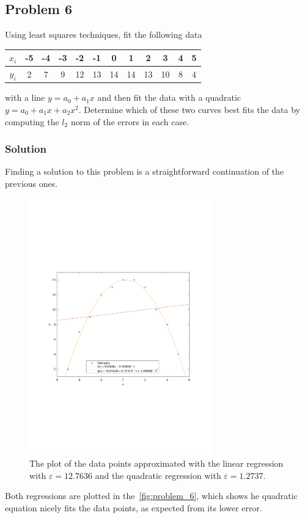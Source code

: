 \subsection{Problem 6}%
\label{sec:problem_6}
Using least squares techniques, fit the following data
\begin{center}
  \begin{tabular}{|c|c|c|c|c|c|c|c|c|c|c|c|}
    \hline
    $x_i$ & -5 & -4 & -3 & -2 & -1 & 0 & 1 & 2 & 3 & 4 & 5 \\
    \hline
    $y_i$ & 2 & 7 & 9 & 12 & 13 & 14 & 14 & 13 & 10 & 8 & 4 \\
    \hline
  \end{tabular}
\end{center}
with a line $y=a_0+a_1x$ and then fit the data with a quadratic $y=a_0+a_1x+a_2x^2$.
Determine which of these two curves best fits the data by computing the $l_2$ norm of
the errors in each case.
\subsubsection*{Solution}
Finding a solution to this problem is a straightforward continuation of the previous
ones.

\begin{figure}
  \centering
  \includegraphics[width=0.7\textwidth]{images/Problem_6_plot.pdf}
  \caption{The plot of the data points approximated with the linear regression with
    $\varepsilon = 12.7636$ and the quadratic regression with $\varepsilon = 1.2737$.}
  \label{fig:problem_6}
\end{figure}

Both regressions are plotted in the~\autoref{fig:problem_6}, which shows he quadratic
equation nicely fits the data points, as expected from its lower error.
